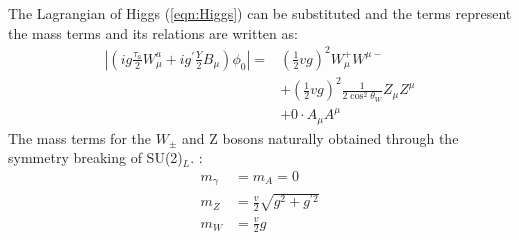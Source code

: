 The Lagrangian of Higgs (\ref{eqn:Higgs}) can be substituted and 
the terms represent the mass terms and its relations are written as:
\begin{equation}
\begin{aligned}
\left|\left(i g \frac{\tau_{a}}{2} W_{\mu}^{a}+i g^{\prime} \frac{Y}{2} B_{\mu}\right) \phi_{0}\right|=&\left(\frac{1}{2} v g\right)^{2} W_{\mu}^{+} W^{\mu-} \\
&+\left(\frac{1}{2} v g\right)^{2} \frac{1}{2 \cos ^{2} \theta_{W}} Z_{\mu} Z^{\mu} \\
&+0 \cdot A_{\mu} A^{\mu}
\end{aligned}
\end{equation}
The mass terms for the $W_\pm$ and Z bosons naturally obtained through the symmetry breaking of SU(2)$_L$. :
\begin{equation}
\begin{aligned}
m_{\gamma} &=m_{A}=0 \\
m_{Z} &=\frac{v}{2} \sqrt{g^{2}+g^{\prime 2}} \\
m_{W} &=\frac{v}{2} g
\end{aligned}
\end{equation}


